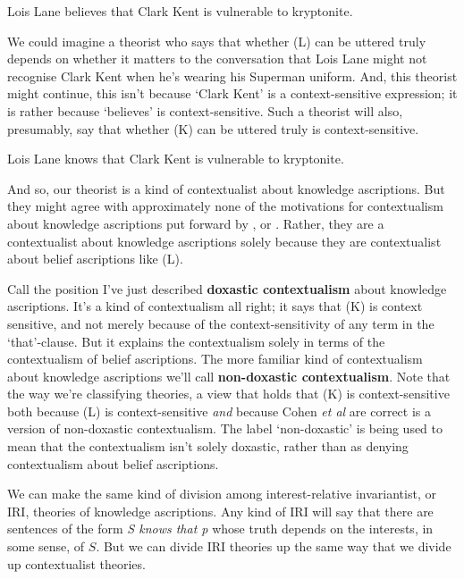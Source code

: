 \documentclass[11pt,oneside]{book}
\begin{document}
\begin{enumerate*}
\setcounter{enumi}{11}
\renewcommand{\labelenumi}{(\Alph{enumi})}
\item Lois Lane believes that Clark Kent is vulnerable to kryptonite.
\end{enumerate*}

\noindent We could imagine a theorist who says that whether (L) can be uttered truly depends on whether it matters to the conversation that Lois Lane might not recognise Clark Kent when he's wearing his Superman uniform. And, this theorist might continue, this isn't because `Clark Kent' is a context-sensitive expression; it is rather because `believes' is context-sensitive.  Such a theorist will also, presumably, say that whether (K) can be uttered truly is context-sensitive.

\begin{enumerate*}
\setcounter{enumi}{10}
\renewcommand{\labelenumi}{(\Alph{enumi})}
\item Lois Lane knows that Clark Kent is vulnerable to kryptonite.
\end{enumerate*}

\noindent And so, our theorist is a kind of contextualist about knowledge ascriptions. But they might agree with approximately none of the motivations for contextualism about knowledge ascriptions put forward by \cite{Cohen1988}, \cite{DeRose1995} or \cite{Lewis1996b}. Rather, they are a contextualist about knowledge ascriptions solely because they are contextualist about belief ascriptions like (L).

Call the position I've just described \textbf{doxastic contextualism} about knowledge ascriptions. It's a kind of contextualism all right; it says that (K) is context sensitive, and not merely because of the context-sensitivity of any term in the `that'-clause. But it explains the contextualism solely in terms of the contextualism of belief ascriptions. The more familiar kind of contextualism about knowledge ascriptions we'll call \textbf{non-doxastic contextualism}. Note that the way we're classifying theories, a view that holds that (K) is context-sensitive both because (L) is context-sensitive \textit{and} because Cohen \textit{et al} are correct is a version of non-doxastic contextualism. The label `non-doxastic' is being used to mean that the contextualism isn't solely doxastic, rather than as denying contextualism about belief ascriptions.

We can make the same kind of division among interest-relative invariantist, or IRI, theories of knowledge ascriptions. Any kind of IRI will say that there are sentences of the form \textit{S knows that p} whose truth depends on the interests, in some sense, of $S$. But we can divide IRI theories up the same way that we divide up contextualist theories.
\end{document}
